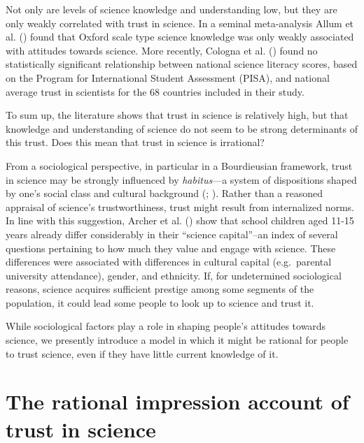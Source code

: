 \documentclass[
  jou,
  floatsintext,
  longtable,
  nolmodern,
  notxfonts,
  notimes,
  colorlinks=true,linkcolor=blue,citecolor=blue,urlcolor=blue]{apa7}
\begin{document}
Not only are levels of science knowledge and understanding low, but they
are only weakly correlated with trust in science. In a seminal
meta-analysis Allum et al.
() found that
Oxford scale type science knowledge was only weakly associated with
attitudes towards science. More recently, Cologna et al.
() found no
statistically significant relationship between national science literacy
scores, based on the Program for International Student Assessment
(PISA), and national average trust in scientists for the 68 countries
included in their study.

To sum up, the literature shows that trust in science is relatively
high, but that knowledge and understanding of science do not seem to be
strong determinants of this trust. Does this mean that trust in science
is irrational?

From a sociological perspective, in particular in a Bourdieusian
framework, trust in science may be strongly influenced by
\emph{habitus}---a system of dispositions shaped by one's social class
and cultural background
(; ). Rather than a reasoned appraisal of science's trustworthiness,
trust might result from internalized norms. In line with this
suggestion, Archer et al.
() show that
school children aged 11-15 years already differ considerably in their
``science capital''--an index of several questions pertaining to how
much they value and engage with science. These differences were
associated with differences in cultural capital (e.g.~parental
university attendance), gender, and ethnicity. If, for undetermined
sociological reasons, science acquires sufficient prestige among some
segments of the population, it could lead some people to look up to
science and trust it.

While sociological factors play a role in shaping people's attitudes
towards science, we presently introduce a model in which it might be
rational for people to trust science, even if they have little current
knowledge of it.

\section{The rational impression account of trust in
science}\label{the-rational-impression-account-of-trust-in-science}
\end{document}
